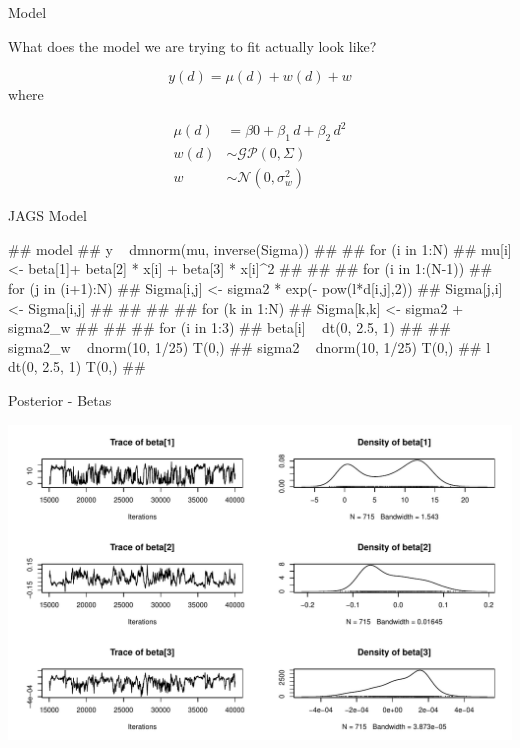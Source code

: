 \documentclass[11pt,ignorenonframetext,]{beamer}
\let\oldShaded\Shaded
\let\endoldShaded\endShaded
\let\oldverbatim\verbatim
\let\endoldverbatim\endverbatim
\renewenvironment{verbatim}{\footnotesize\begin{spacing}{0.9}\oldverbatim}{\endoldverbatim\end{spacing}}
\newcommand{\scriptoutput}{
  \renewenvironment{Shaded}{\scriptsize\begin{spacing}{0.9}\oldShaded}{\endoldShaded\end{spacing}}
  \renewenvironment{verbatim}{\scriptsize\begin{spacing}{0.9}\oldverbatim}{\endoldverbatim\end{spacing}}
}
\begin{document}
\begin{frame}[t]{Model}

What does the model we are trying to fit actually look like?

\pause

\vspace{2mm}

\[ y(d) = \mu(d) + w(d) + w \] where

\[\begin{aligned}
\mu(d) &= \beta0 + \beta_1\, d +\beta_2\, d^2\\
w(d) &\sim \mathcal{GP}(0, \Sigma) \\
w &\sim \mathcal{N}(0, \sigma^2_w)
\end{aligned}\]

\end{frame}

\begin{frame}[fragile]{JAGS Model}

\scriptoutput

\begin{verbatim}
## model{
##   y ~ dmnorm(mu, inverse(Sigma))
## 
##   for (i in 1:N) {
##     mu[i] <- beta[1]+ beta[2] * x[i] + beta[3] * x[i]^2
##   }
##   
##   for (i in 1:(N-1)) {
##     for (j in (i+1):N) {
##       Sigma[i,j] <- sigma2 * exp(- pow(l*d[i,j],2))
##       Sigma[j,i] <- Sigma[i,j]
##     }
##   }
## 
##   for (k in 1:N) {
##     Sigma[k,k] <- sigma2 + sigma2_w
##   }
## 
##   for (i in 1:3) {
##     beta[i] ~ dt(0, 2.5, 1)
##   }
##   sigma2_w ~ dnorm(10, 1/25) T(0,)
##   sigma2   ~ dnorm(10, 1/25) T(0,)
##   l        ~ dt(0, 2.5, 1) T(0,) 
## }
\end{verbatim}

\end{frame}

\begin{frame}{Posterior - Betas}

\includegraphics{Lec13_files/figure-beamer/unnamed-chunk-18-1.pdf}

\end{frame}
\end{document}
